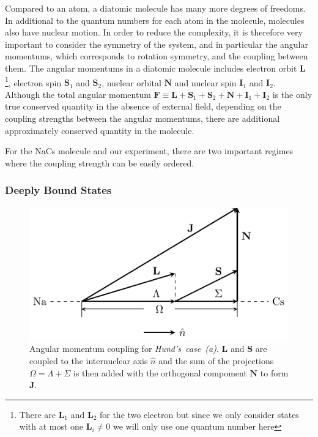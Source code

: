 Compared to an atom, a diatomic molecule has many more degrees of freedoms.
In additional to the quantum numbers for each atom in the molecule,
molecules also have nuclear motion.
In order to reduce the complexity, it is therefore very important to consider the
symmetry of the system, and in particular the angular momentums,
which corresponds to rotation symmetry, and the coupling between them.
The angular momentums in a diatomic molecule includes electron orbit $\mathbf{L}$
\footnote{There are $\mathbf{L}_1$ and $\mathbf{L}_2$ for the two electron but since
  we only consider states with at most one $\mathbf{L}_i\neq0$ we will only use one quantum number here},
electron spin $\mathbf{S}_1$ and $\mathbf{S}_2$, nuclear orbital $\mathbf{N}$
and nuclear spin $\mathbf{I}_1$ and $\mathbf{I}_2$.
Although the total angular momentum
$\mathbf{F}\equiv\mathbf{L}+\mathbf{S}_1+\mathbf{S}_2+\mathbf{N}+\mathbf{I}_1+\mathbf{I}_2$
is the only true conserved quantity in the absence of external field,
depending on the coupling strengths between the angular momentums,
there are additional approximately conserved quantity in the molecule.

For the NaCs molecule and our experiment, there are two important regimes where the coupling
strength can be easily ordered.

\subsubsection{Deeply Bound States}
\label{ch:pa:angular-momentums:deep}

\begin{figure}
  \centering
  \includegraphics[width=\textwidth]{figures/pa_hunds_case_a.pdf}
  \caption[Hund's~case~(a)]{
    Angular momentum coupling for \textit{Hund's~case~(a)}.
    $\mathbf{L}$ and $\mathbf{S}$ are coupled to the internuclear axis $\hat n$
    and the sum of the projections $\Omega=\Lambda+\Sigma$ is then
    added with the orthogonal compoment $\mathbf{N}$ to form $\mathbf{J}$.
    \label{fig:pa:hunds-case-a}}
\end{figure}

